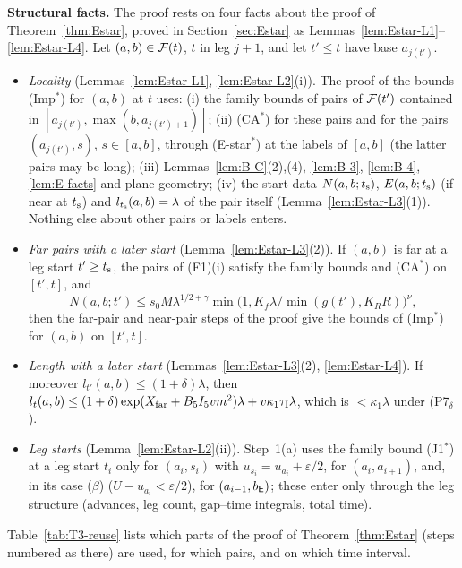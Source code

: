 \medskip\noindent\textbf{Structural facts.} The proof rests on four facts about the proof of Theorem~\ref{thm:Estar}, proved in
Section~\ref{sec:Estar} as Lemmas~\ref{lem:Estar-L1}--\ref{lem:Estar-L4}. Let $(a,b)\in\mathcal F(t)$, $t$ in leg $j+1$, and let
$t'\le t$ have base $a_{j(t')}$.
\begin{itemize}
\item[(F1)] \emph{Locality} (Lemmas~\ref{lem:Estar-L1}, \ref{lem:Estar-L2}(i)). The proof of the bounds (Imp$^*$) for $(a,b)$ at
$t$ uses: (i) the family bounds of pairs of $\mathcal F(t')$ contained in $[a_{j(t')},\max(b,a_{j(t')+1})]$; (ii) (CA$^*$) for these
pairs and for the pairs $(a_{j(t')},s)$, $s\in[a,b]$, through (E-star$^*$) at the labels of $[a,b]$ (the latter pairs may be
long); (iii) Lemmas~\ref{lem:B-C}(2),(4), \ref{lem:B-3}, \ref{lem:B-4}, \ref{lem:E-facts} and plane geometry; (iv) the start data
$N(a,b;t_{\mathrm s})$, $E(a,b;t_{\mathrm s})$ (if near at $t_{\mathrm s}$) and $l_{t_{\mathrm s}}(a,b)=\lambda$ of the pair itself
(Lemma~\ref{lem:Estar-L3}(1)). Nothing else about other pairs or labels enters.
\item[(F2)] \emph{Far pairs with a later start} (Lemma~\ref{lem:Estar-L3}(2)). If $(a,b)$ is far at a leg start $t'\ge t_{\mathrm s}$, the
pairs of (F1)(i) satisfy the family bounds and (CA$^*$) on $[t',t]$, and
\[
N(a,b;t')\le s_0M\lambda^{1/2+\gamma}\min\bigl(1,K_f\lambda/\min(g(t'),K_RR)\bigr)^\nu,
\]
then the far-pair and near-pair steps of the proof give the bounds of (Imp$^*$) for $(a,b)$ on $[t',t]$.
\item[(F3)] \emph{Length with a later start} (Lemmas~\ref{lem:Estar-L3}(2), \ref{lem:Estar-L4}). If moreover
$l_{t'}(a,b)\le(1+\delta)\lambda$, then $l_t(a,b)\le(1+\delta)\exp(X_{\mathrm{far}}+B_5I_5vm^2)\lambda+v\kappa_1\tau_{\mathrm I}\lambda$, which is
$<\kappa_1\lambda$ under (P7$_\delta$).
\item[(F4)] \emph{Leg starts} (Lemma~\ref{lem:Estar-L2}(ii)). Step~1(a) uses the family bound (J1$^*$) at a leg start $t_i$ only for
$(a_i,s_i)$ with $u_{s_i}=u_{a_i}+\varepsilon/2$, for $(a_i,a_{i+1})$, and, in its case ($\beta$) ($U-u_{a_i}<\varepsilon/2$), for
$(a_{i-1},b_{\mathsf E})$; these enter only through the leg structure (advances, leg count, gap--time integrals, total time).
\end{itemize}
Table~\ref{tab:T3-reuse} lists which parts of the proof of Theorem~\ref{thm:Estar} (steps numbered as there) are used, for which
pairs, and on which time interval.

